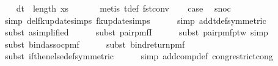 \begin{isabellebody}
\ \ \isamarkupfalse%
\ d{\isacharcolon}{\kern0pt}{\isachardoublequoteopen}t{}\ {\isacharequal}{\kern0pt}\ length\ xs{\isachardoublequoteclose}\ \isanewline
\ \ \ \ \isamarkupfalse%
\ {\isacharparenleft}{\kern0pt}metis\ t{\isacharunderscore}{\kern0pt}def\ fst{\isacharunderscore}{\kern0pt}conv{\isacharparenright}{\kern0pt}\isanewline
\isanewline
\ \ \isamarkupfalse%
\ {\isacharquery}{\kern0pt}case\ \isamarkupfalse%
\ snoc\isanewline
\ \ \ \ \isamarkupfalse%
\ {\isacharparenleft}{\kern0pt}simp\ del{\isacharcolon}{\kern0pt}fk{\isacharunderscore}{\kern0pt}update{\isacharprime}{\kern0pt}{\isacharprime}{\kern0pt}{\isachardot}{\kern0pt}simps\ fk{\isacharunderscore}{\kern0pt}update{\isacharprime}{\kern0pt}{\isachardot}{\kern0pt}simps{\isacharparenright}{\kern0pt}\isanewline
\ \ \ \ \isamarkupfalse%
\ {\isacharparenleft}{\kern0pt}simp\ add{\isacharcolon}{\kern0pt}t{\isacharunderscore}{\kern0pt}def{\isacharbrackleft}{\kern0pt}symmetric{\isacharbrackright}{\kern0pt}{\isacharparenright}{\kern0pt}\isanewline
\ \ \ \ \isamarkupfalse%
\ {\isacharparenleft}{\kern0pt}subst\ a{\isacharbrackleft}{\kern0pt}simplified{\isacharbrackright}{\kern0pt}{\isacharparenright}{\kern0pt}\isanewline
\ \ \ \ \isamarkupfalse%
\ {\isacharparenleft}{\kern0pt}subst\ pair{\isacharunderscore}{\kern0pt}pmfI{\isacharparenright}{\kern0pt}\isanewline
\ \ \ \ \isamarkupfalse%
\ {\isacharparenleft}{\kern0pt}subst\ pair{\isacharunderscore}{\kern0pt}pmf{\isacharunderscore}{\kern0pt}ptw{\isacharcomma}{\kern0pt}\ simp{\isacharparenright}{\kern0pt}\isanewline
\ \ \ \ \isamarkupfalse%
\ {\isacharparenleft}{\kern0pt}subst\ bind{\isacharunderscore}{\kern0pt}assoc{\isacharunderscore}{\kern0pt}pmf{\isacharparenright}{\kern0pt}\isanewline
\ \ \ \ \isamarkupfalse%
\ {\isacharparenleft}{\kern0pt}subst\ bind{\isacharunderscore}{\kern0pt}return{\isacharunderscore}{\kern0pt}pmf{\isacharparenright}{\kern0pt}\isanewline
\ \ \ \ \isamarkupfalse%
\ {\isacharparenleft}{\kern0pt}subst\ if{\isacharunderscore}{\kern0pt}then{\isacharunderscore}{\kern0pt}else{\isacharunderscore}{\kern0pt}def{\isacharbrackleft}{\kern0pt}symmetric{\isacharbrackright}{\kern0pt}{\isacharparenright}{\kern0pt}\isanewline
\ \ \ \ \isamarkupfalse%
\ {\isacharparenleft}{\kern0pt}simp\ add{\isacharcolon}{\kern0pt}comp{\isacharunderscore}{\kern0pt}def\ cong{\isacharcolon}{\kern0pt}restrict{\isacharunderscore}{\kern0pt}cong{\isacharparenright}{\kern0pt}\isanewline

\end{isabellebody}
